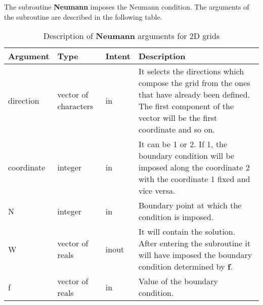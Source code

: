 The subroutine \textbf{Neumann} imposes the Neumann condition. The arguments of the subroutine are described in the following table.

\begin{table}[H]
	\begin{center}
		\begin{spacing}{1.2}
			\begin{tabular}{| l | l | l | p{6cm} |}
				
				\hline
				
				\bf Argument & \bf Type & \bf Intent & \bf Description \\ \hline \hline
				
				direction & vector of characters & in & It selects the directions  which compose the grid from the ones that have already been defined. The first component of the vector will be the first coordinate and so on.  \\ \hline
				
				coordinate & integer & in &  It can be 1 or 2. If 1, the boundary condition will be imposed along the coordinate 2 with the coordinate 1 fixed and vice versa. \\ \hline
				
				N &  integer & in & Boundary point at which the condition is imposed.\\ \hline
				
				W &  vector of reals & inout & It will contain the solution. After entering the subroutine it will have imposed the boundary condition determined by \textbf{f}.\\ \hline
				
				f & vector of reals & in & Value of the boundary condition.\\ \hline
				
			\end{tabular}
		\end{spacing}
	\end{center}
	\caption{Description of \textbf{Neumann} arguments for 2D grids}
\end{table}
